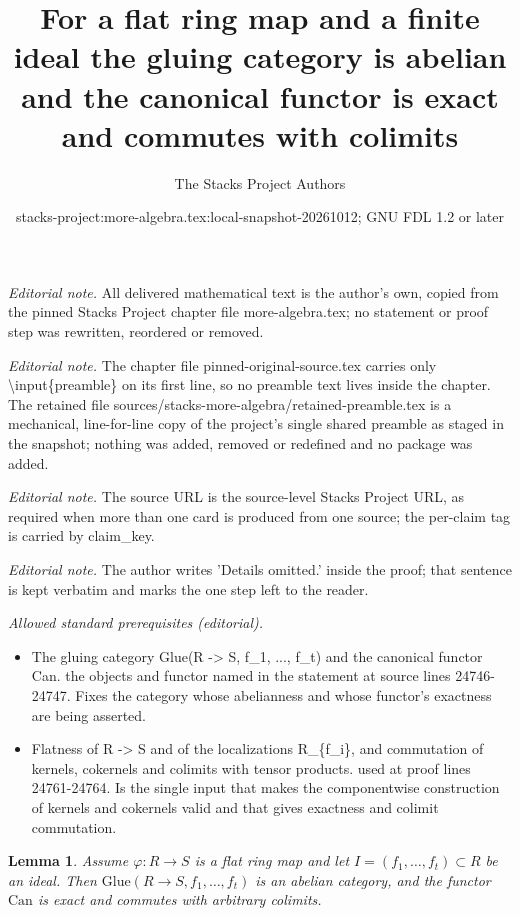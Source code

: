 \documentclass[10pt,a4paper]{amsart}
\title{For a flat ring map and a finite ideal the gluing category is abelian and the canonical functor is exact and commutes with colimits}
\author{The Stacks Project Authors}
\date{stacks-project:more-algebra.tex:local-snapshot-20261012; GNU FDL 1.2 or later}
\theoremstyle{plain}
\newtheorem{lemma}[subsection]{Lemma}
\theoremstyle{definition}
\theoremstyle{remark}
\numberwithin{equation}{subsection}
\begin{document}
\maketitle
\setcounter{subsection}{1}
\noindent\textit{Editorial note.} All delivered mathematical text is the author's own, copied from the pinned Stacks Project chapter file more-algebra.tex; no statement or proof step was rewritten, reordered or removed.\par\medskip
\noindent\textit{Editorial note.} The chapter file pinned-original-source.tex carries only \textbackslash{}input\{preamble\} on its first line, so no preamble text lives inside the chapter. The retained file sources/stacks-more-algebra/retained-preamble.tex is a mechanical, line-for-line copy of the project's single shared preamble as staged in the snapshot; nothing was added, removed or redefined and no package was added.\par\medskip
\noindent\textit{Editorial note.} The source URL is the source-level Stacks Project URL, as required when more than one card is produced from one source; the per-claim tag is carried by claim\_key.\par\medskip
\noindent\textit{Editorial note.} The author writes 'Details omitted.' inside the proof; that sentence is kept verbatim and marks the one step left to the reader.\par\medskip
\noindent\textit{Allowed standard prerequisites (editorial).}\begin{itemize}
\item The gluing category Glue(R -> S, f\_1, ..., f\_t) and the canonical functor Can. the objects and functor named in the statement at source lines 24746-24747. Fixes the category whose abelianness and whose functor's exactness are being asserted.
\item Flatness of R -> S and of the localizations R\_\{f\_i\}, and commutation of kernels, cokernels and colimits with tensor products. used at proof lines 24761-24764. Is the single input that makes the componentwise construction of kernels and cokernels valid and that gives exactness and colimit commutation.
\end{itemize}\medskip
\begin{lemma}
\label{lemma-exact}
Assume $\varphi : R \to S$ is a flat ring map and let
$I = (f_1, \ldots, f_t) \subset R$ be an ideal.
Then $\text{Glue}(R \to S, f_1, \ldots, f_t)$ is an abelian category, and
the functor $\text{Can}$ is exact and commutes with arbitrary colimits.
\end{lemma}
\end{document}
